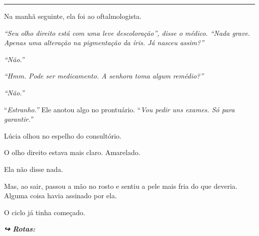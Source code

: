 \vspace{0.5em}\noindent\rule{\textwidth}{0.5pt}\vspace{0.5em}

\noindent Na manhã seguinte, ela foi ao oftalmologista.

\noindent \textit{\textquotedblleft{}Seu olho direito está com uma leve descoloração\textquotedblright{}\textit{, disse o médico. }\textquotedblleft{}Nada grave. Apenas uma alteração na pigmentação da íris. Já nasceu assim?\textquotedblright{}}

\noindent \textit{\textquotedblleft{}Não.\textquotedblright{}}

\noindent \textit{\textquotedblleft{}Hmm. Pode ser medicamento. A senhora toma algum remédio?\textquotedblright{}}

\noindent \textit{\textquotedblleft{}Não.\textquotedblright{}}

\noindent \textquotedblleft{\textit{Estranho.\textquotedblright{}} Ele anotou algo no prontuário. }\textquotedblleft{\textit{Vou pedir uns exames. Só para garantir.\textquotedblright{}}}

\noindent Lúcia olhou no espelho do consultório.

\noindent O olho direito estava mais claro.
Amarelado.

\noindent Ela não disse nada.

\noindent Mas, ao sair, passou a mão no rosto e sentiu a pele mais fria do que deveria.
\noindent Alguma coisa havia assinado por ela.

\noindent O ciclo já tinha começado.

\vspace{0.5em}
\noindent\textit{\textbf{↪ Rotas:}  \rotasep {}}